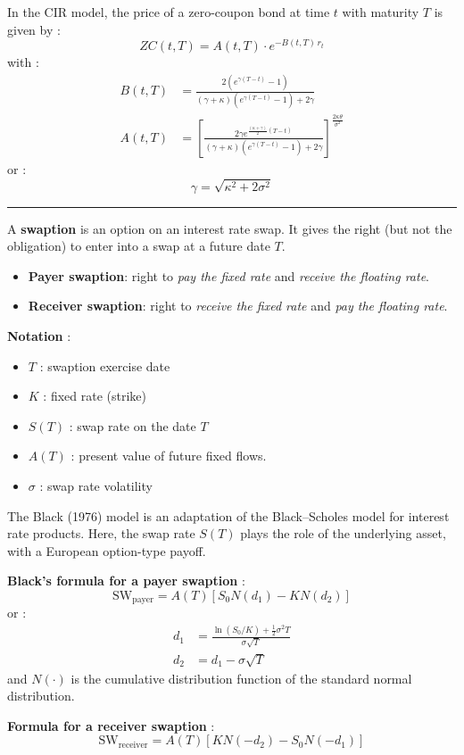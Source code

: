 \begin{f}
In the CIR model, the price of a zero-coupon bond at time $t$ with maturity $T$ is given by :
\[
ZC(t, T) = A(t, T) \cdot e^{-B(t, T)\, r_t}
\]
with :
\[
\begin{aligned}
	B(t, T) &= \frac{2 (e^{\gamma (T - t)} - 1)}{(\gamma + \kappa)(e^{\gamma (T - t)} - 1) + 2\gamma} \\
	A(t, T) &= \left[ \frac{2\gamma e^{\frac{(\kappa + \gamma)}{2}(T - t)}}{(\gamma + \kappa)(e^{\gamma (T - t)} - 1) + 2\gamma} \right]^{\frac{2\kappa\theta}{\sigma^2}}
\end{aligned}
\]
or :
\[
\gamma = \sqrt{\kappa^2 + 2\sigma^2}
\]

\end{f}
\hrule

\begin{f}

A \textbf{swaption} is an option on an interest rate swap. It gives the right (but not the obligation) to enter into a swap at a future date $T$.

\begin{itemize}[nosep]
	\item \textbf{Payer swaption}: right to \emph{pay the fixed rate} and \emph{receive the floating rate}.
	\item \textbf{Receiver swaption}: right to \emph{receive the fixed rate} and \emph{pay the floating rate}.
\end{itemize}

\textbf{Notation} :
\begin{itemize}[nosep]
	\item $T$ : swaption exercise date
	\item $K$ : fixed rate (strike)
	\item $S(T)$ : swap rate on the date $T$
	\item $A(T)$ : present value of future fixed flows.
	\item $\sigma$ : swap rate volatility
\end{itemize}

The Black (1976) model is an adaptation of the Black–Scholes model for interest rate products. Here, the swap rate $S(T)$ plays the role of the underlying asset, with a European option-type payoff.

\textbf{Black's formula for a payer swaption} :
\[
\text{SW}_{\text{payer}} = A(T) \left[ S_0 N(d_1) - K N(d_2) \right]
\]
or :
\[
\begin{aligned}
	d_1 &= \frac{\ln(S_0 / K) + \frac{1}{2} \sigma^2 T}{\sigma \sqrt{T}} \\
	d_2 &= d_1 - \sigma \sqrt{T}
\end{aligned}
\]
and $N(\cdot)$ is the cumulative distribution function of the standard normal distribution.

\textbf{Formula for a receiver swaption} :
\[
\text{SW}_{\text{receiver}} = A(T) \left[ K N(-d_2) - S_0 N(-d_1) \right]
\]

\end{f}


